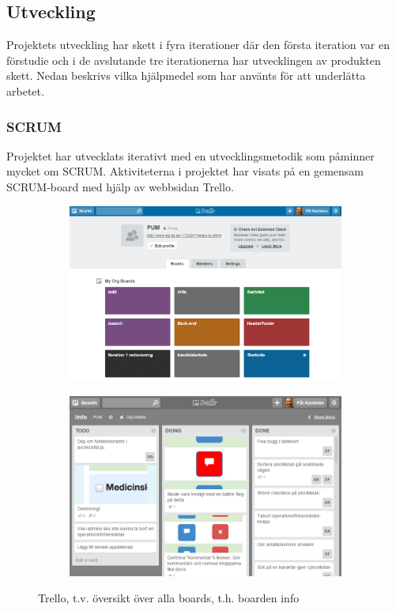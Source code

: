 \documentclass{article}
\begin{document}
\subsection{Utveckling}
Projektets utveckling har skett i fyra iterationer där den första iteration var en förstudie och i de avslutande tre iterationerna har utvecklingen av produkten skett. Nedan beskrivs vilka hjälpmedel som har använts för att underlätta arbetet.
		
\subsubsection{SCRUM}
Projektet har utvecklats iterativt med en utvecklingsmetodik som påminner mycket om SCRUM. Aktiviteterna i projektet har visats på en gemensam SCRUM-board med hjälp av webbsidan Trello. 

\begin{figure}[htbp]
        \centering
        \begin{subfigure}[b]{0.5\textwidth}
                \includegraphics[width=\textwidth]{trello.png}
                \label{fig:gull}
        \end{subfigure}%
        \begin{subfigure}[b]{0.5\textwidth}
                \includegraphics[width=\textwidth]{trello2.png}
                \label{fig:tiger}
        \end{subfigure}
        \caption{Trello, t.v. översikt över alla boards, t.h. boarden info}\label{fig:trello}
\end{figure}
\end{document}
